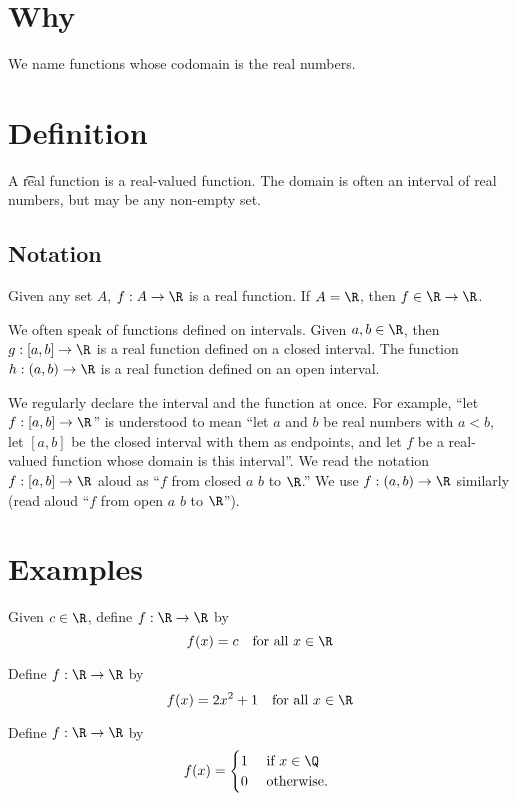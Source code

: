 

\section*{Why}

We name functions whose codomain is the real numbers.

\section*{Definition}

A \t{real function} is a real-valued function.
The domain is often an interval of real numbers, but may be any non-empty set.

\subsection*{Notation}

Given any set $A$, $f: A \to \R $ is a real function.
If $A = \R $, then $f \in \R  \to \R $.

We often speak of functions defined on intervals.
Given $a, b \in \R $, then $g: [a, b] \to \R $ is a real function defined on a closed interval.
The function $h: (a, b) \to \R $ is a real function defined on an open interval.

We regularly declare the interval and the function at once.
For example, ``let $f: [a, b] \to \R $'' is understood to mean ``let $a$ and $b$ be real numbers with $a < b$, let $[a, b]$ be the closed interval with them as endpoints, and let $f$ be a real-valued function whose domain is this interval''.
We read the notation $f: [a, b] \to \R $ aloud as ``$f$ from closed $a$ $b$ to $\R $.''
We use $f: (a, b) \to \R $ similarly (read aloud ``$f$ from open $a$ $b$ to $\R $'').

\section*{Examples}

\begin{example}
Given $c \in \R $, define $f: \R  \to \R $ by
\[
f(x) = c \quad \text{for all } x \in \R
\]
\end{example}

\begin{example}
Define $f: \R  \to \R $ by
\[
f(x) = 2x^2 + 1 \quad \text{for all } x \in \R
\]
\end{example}

\begin{example}
Define $f: \R  \to \R $ by
\[
f(x) = \begin{cases}
1 & \text{ if } x \in \Q  \\
0 & \text{ otherwise. }
\end{cases}
\]
\end{example}
